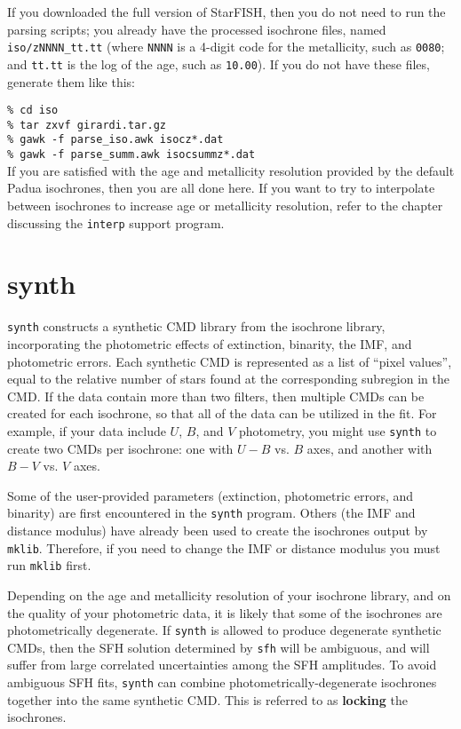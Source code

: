 \documentclass[12pt]{book}
\def\ttg{\tt\color{DarkGreen}}
\begin{document}
If you downloaded the full version of StarFISH, then you do not need 
to run the parsing scripts; you already have the processed isochrone 
files, named {\ttg iso/zNNNN\_tt.tt} (where {\ttg NNNN} is a 4-digit 
code for the metallicity, such as {\ttg 0080}; and {\ttg tt.tt} is the 
log of the age, such as {\ttg 10.00}).  If you do not have these 
files, generate them like this:

\medskip\noindent
{\ttg \% cd iso}\\
{\ttg \% tar zxvf girardi.tar.gz} \\
{\ttg \% gawk -f parse\_iso.awk isocz*.dat} \\
{\ttg \% gawk -f parse\_summ.awk isocsummz*.dat} \\

\medskip
If you are satisfied with the age and metallicity resolution provided 
by the default Padua isochrones, then you are all done here.  If you 
want to try to interpolate between isochrones to increase age or 
metallicity resolution, refer to the chapter discussing the 
{\ttg interp} support program.


\chapter{synth}\label{ch:synth}

{\ttg synth} constructs a synthetic CMD library from the isochrone 
library, incorporating the photometric effects of extinction, 
binarity, the IMF, and photometric errors.  Each synthetic CMD is 
represented as a list of ``pixel values'', equal to the relative number 
of stars found at the corresponding subregion in the CMD.  If the data 
contain more than two filters, then multiple CMDs can be created for 
each isochrone, so that all of the data can be utilized in the fit.  
For example, if your data include $U$, $B$, and $V$ photometry, you 
might use {\ttg synth} to create two CMDs per isochrone: one with 
$U-B$ vs. $B$ axes, and another with $B-V$ vs. $V$ axes.

Some of the user-provided parameters (extinction, photometric errors, 
and binarity) are first encountered in the {\ttg synth} program. 
Others (the IMF and distance modulus) have already been used to 
create the isochrones output by {\ttg mklib}.  Therefore, if you need 
to change the IMF or distance modulus you must run {\ttg mklib} first. 

Depending on the age and metallicity resolution of your isochrone 
library, and on the quality of your photometric data, it is likely
that some of the isochrones are photometrically degenerate.  If 
{\ttg synth} is allowed to produce degenerate synthetic CMDs, then the 
SFH solution determined by {\ttg sfh} will be ambiguous, and will 
suffer from large correlated uncertainties among the SFH amplitudes.  
To avoid ambiguous SFH fits, {\ttg synth} can combine 
photometrically-degenerate isochrones together into the same synthetic 
CMD.  This is referred to as {\bf locking} the isochrones. 
\end{document}
